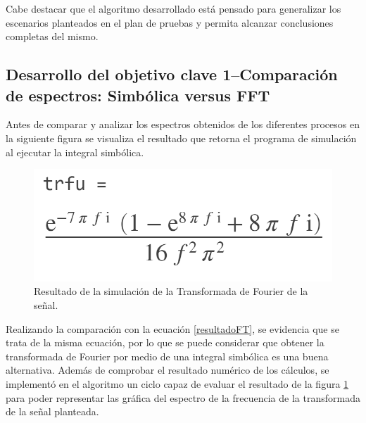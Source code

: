 \documentclass[11pt,letterpaper,twocolumn]{article}
\begin{document}
    Cabe destacar que el algoritmo desarrollado está pensado para generalizar los escenarios planteados 
    en el plan de pruebas y permita alcanzar conclusiones completas del mismo.
    
    \subsection{Desarrollo del objetivo clave 1--Comparación de espectros: Simbólica versus FFT}
        Antes de comparar y analizar los espectros obtenidos de los diferentes procesos en la siguiente figura 
        se visualiza el resultado que retorna el programa de simulación al ejecutar la integral simbólica.
        
        \begin{figure}[H]
            \centering 
            \centering
            \includegraphics[width=0.5\linewidth]{img/ResultadoEcuacionMATLAB.png}
            \caption{Resultado de la simulación de la Transformada de Fourier de la señal.}
            \label{resultadoEcuacionMATLAB}
        \end{figure} 
        
        Realizando la comparación con la ecuación \ref{resultadoFT}, se evidencia que se trata de 
        la misma ecuación, por lo que se puede considerar que obtener la transformada de Fourier
        por medio de una integral simbólica es una buena alternativa. Además de comprobar el resultado
        numérico de los cálculos, se implementó en el algoritmo un ciclo capaz de evaluar el resultado
        de la figura \ref{resultadoEcuacionMATLAB} para poder representar las gráfica del espectro de la
        frecuencia de la transformada de la señal planteada.
         
\end{document}
